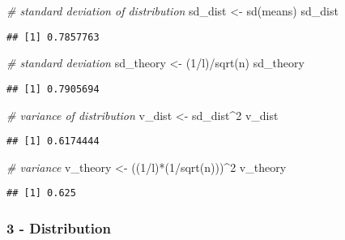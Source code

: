 \documentclass[
]{article}
\newenvironment{Shaded}{\begin{snugshade}}{\end{snugshade}}
\newcommand{\CommentTok}[1]{\textcolor[rgb]{0.56,0.35,0.01}{\textit{#1}}}
\newcommand{\DecValTok}[1]{\textcolor[rgb]{0.00,0.00,0.81}{#1}}
\newcommand{\FunctionTok}[1]{\textcolor[rgb]{0.00,0.00,0.00}{#1}}
\newcommand{\NormalTok}[1]{#1}
\newcommand{\OtherTok}[1]{\textcolor[rgb]{0.56,0.35,0.01}{#1}}
\newcommand{\SpecialCharTok}[1]{\textcolor[rgb]{0.00,0.00,0.00}{#1}}
\begin{document}
\begin{Shaded}
\begin{Highlighting}[]
\CommentTok{\# standard deviation of distribution}
\NormalTok{sd\_dist }\OtherTok{\textless{}{-}} \FunctionTok{sd}\NormalTok{(means)}
\NormalTok{sd\_dist}
\end{Highlighting}
\end{Shaded}

\begin{verbatim}
## [1] 0.7857763
\end{verbatim}

\begin{Shaded}
\begin{Highlighting}[]
\CommentTok{\# standard deviation }
\NormalTok{sd\_theory }\OtherTok{\textless{}{-}}\NormalTok{ (}\DecValTok{1}\SpecialCharTok{/}\NormalTok{l)}\SpecialCharTok{/}\FunctionTok{sqrt}\NormalTok{(n)}
\NormalTok{sd\_theory}
\end{Highlighting}
\end{Shaded}

\begin{verbatim}
## [1] 0.7905694
\end{verbatim}

\begin{Shaded}
\begin{Highlighting}[]
\CommentTok{\# variance of distribution}
\NormalTok{v\_dist }\OtherTok{\textless{}{-}}\NormalTok{ sd\_dist}\SpecialCharTok{\^{}}\DecValTok{2}
\NormalTok{v\_dist}
\end{Highlighting}
\end{Shaded}

\begin{verbatim}
## [1] 0.6174444
\end{verbatim}

\begin{Shaded}
\begin{Highlighting}[]
\CommentTok{\# variance}
\NormalTok{v\_theory }\OtherTok{\textless{}{-}}\NormalTok{ ((}\DecValTok{1}\SpecialCharTok{/}\NormalTok{l)}\SpecialCharTok{*}\NormalTok{(}\DecValTok{1}\SpecialCharTok{/}\FunctionTok{sqrt}\NormalTok{(n)))}\SpecialCharTok{\^{}}\DecValTok{2}
\NormalTok{v\_theory}
\end{Highlighting}
\end{Shaded}

\begin{verbatim}
## [1] 0.625
\end{verbatim}

\hypertarget{distribution}{%
\subsubsection{3 - Distribution}\label{distribution}}
\end{document}
